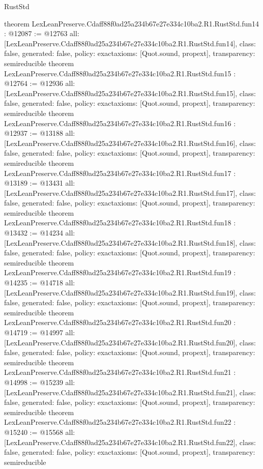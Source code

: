 \begin{lexlean}{RustStd}
\begin{coremodule}
{}
theorem LexLeanPreserve.Cdaff88f0ad25a234b67e27e334c10ba2.R1.RustStd.fun14 : @12087 := @12763 {
  all: [LexLeanPreserve.Cdaff88f0ad25a234b67e27e334c10ba2.R1.RustStd.fun14],
  class: false,
  generated: false,
  policy: exact{axioms: [Quot.sound, propext]},
  transparency: semireducible
}
theorem LexLeanPreserve.Cdaff88f0ad25a234b67e27e334c10ba2.R1.RustStd.fun15 : @12764 := @12936 {
  all: [LexLeanPreserve.Cdaff88f0ad25a234b67e27e334c10ba2.R1.RustStd.fun15],
  class: false,
  generated: false,
  policy: exact{axioms: [Quot.sound, propext]},
  transparency: semireducible
}
theorem LexLeanPreserve.Cdaff88f0ad25a234b67e27e334c10ba2.R1.RustStd.fun16 : @12937 := @13188 {
  all: [LexLeanPreserve.Cdaff88f0ad25a234b67e27e334c10ba2.R1.RustStd.fun16],
  class: false,
  generated: false,
  policy: exact{axioms: [Quot.sound, propext]},
  transparency: semireducible
}
theorem LexLeanPreserve.Cdaff88f0ad25a234b67e27e334c10ba2.R1.RustStd.fun17 : @13189 := @13431 {
  all: [LexLeanPreserve.Cdaff88f0ad25a234b67e27e334c10ba2.R1.RustStd.fun17],
  class: false,
  generated: false,
  policy: exact{axioms: [Quot.sound, propext]},
  transparency: semireducible
}
theorem LexLeanPreserve.Cdaff88f0ad25a234b67e27e334c10ba2.R1.RustStd.fun18 : @13432 := @14234 {
  all: [LexLeanPreserve.Cdaff88f0ad25a234b67e27e334c10ba2.R1.RustStd.fun18],
  class: false,
  generated: false,
  policy: exact{axioms: [Quot.sound, propext]},
  transparency: semireducible
}
theorem LexLeanPreserve.Cdaff88f0ad25a234b67e27e334c10ba2.R1.RustStd.fun19 : @14235 := @14718 {
  all: [LexLeanPreserve.Cdaff88f0ad25a234b67e27e334c10ba2.R1.RustStd.fun19],
  class: false,
  generated: false,
  policy: exact{axioms: [Quot.sound, propext]},
  transparency: semireducible
}
theorem LexLeanPreserve.Cdaff88f0ad25a234b67e27e334c10ba2.R1.RustStd.fun20 : @14719 := @14997 {
  all: [LexLeanPreserve.Cdaff88f0ad25a234b67e27e334c10ba2.R1.RustStd.fun20],
  class: false,
  generated: false,
  policy: exact{axioms: [Quot.sound, propext]},
  transparency: semireducible
}
theorem LexLeanPreserve.Cdaff88f0ad25a234b67e27e334c10ba2.R1.RustStd.fun21 : @14998 := @15239 {
  all: [LexLeanPreserve.Cdaff88f0ad25a234b67e27e334c10ba2.R1.RustStd.fun21],
  class: false,
  generated: false,
  policy: exact{axioms: [Quot.sound, propext]},
  transparency: semireducible
}
theorem LexLeanPreserve.Cdaff88f0ad25a234b67e27e334c10ba2.R1.RustStd.fun22 : @15240 := @15568 {
  all: [LexLeanPreserve.Cdaff88f0ad25a234b67e27e334c10ba2.R1.RustStd.fun22],
  class: false,
  generated: false,
  policy: exact{axioms: [Quot.sound, propext]},
  transparency: semireducible
}
\end{coremodule}
\end{lexlean}
